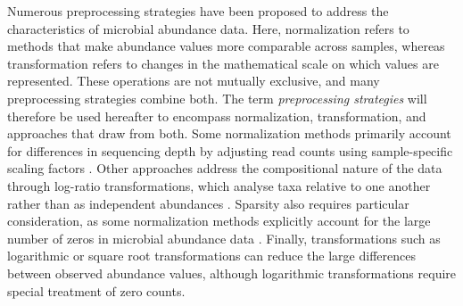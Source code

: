 \documentclass[pdflatex,sn-vancouver-num]{sn-jnl}%
\theoremstyle{thmstyleone}%
\theoremstyle{thmstyletwo}%
\theoremstyle{thmstylethree}%
\begin{document}
Numerous preprocessing strategies have been proposed to address the characteristics of microbial abundance data. Here, normalization refers to methods that make abundance values more comparable across samples, whereas transformation refers to changes in the mathematical scale on which values are represented. These operations are not mutually exclusive, and many preprocessing strategies combine both. The term \textit{preprocessing strategies} will therefore be used hereafter to encompass normalization, transformation, and approaches that draw from both. Some normalization methods primarily account for differences in sequencing depth by adjusting read counts using sample-specific scaling factors \citep{weiss_normalization_2017}. Other approaches address the compositional nature of the data through log-ratio transformations, which analyse taxa relative to one another rather than as independent abundances \citep{quinn_understanding_2018}. Sparsity also requires particular consideration, as some normalization methods explicitly account for the large number of zeros in microbial abundance data \citep{chen_gmpr_2018,martino_novel_2019}. Finally, transformations such as logarithmic or square root transformations can reduce the large differences between observed abundance values, although logarithmic transformations require special treatment of zero counts.


\end{document}
